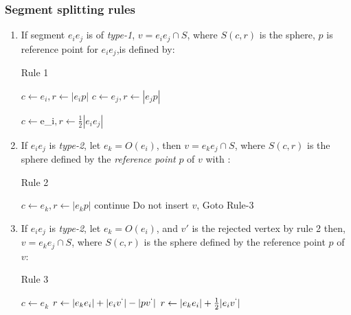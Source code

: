 \documentclass{beamer}
\begin{document}
\begin{frame}[allowframebreaks]
\frametitle{Segment splitting rules}
\begin{enumerate}
	\item	If segment $e_{i}e_{j}$ is of \textit{type-1}, $v = e_{i}e_{j}\cap S$, where $S(c, r)$ is the sphere, $p$ is reference point for $e_{i}e_{j}$,is defined by:
		\begin{algorithm}[H]
		\caption{Rule 1}
		\begin{algorithmic}[1]
				\State $c \gets e_i, r \gets |e_{i}p|$
				\State $c \gets e_j, r \gets |e_{j}p|$
			
			\Else
				\State $c \gets $e_i$, r \gets \frac{1}{2}|e_{i}e_{j}|$
			\EndIf	
		\EndProcedure
		\end{algorithmic}
		\end{algorithm}  
	\framebreak
	\item  If $e_{i}e_j$ is \textit{type-2}, let $e_k = O(e_i)$, then $v = e_{k}e_j \cap S$, where $S(c, r)$ is the sphere defined by the \textit{reference point} $p$ of $v$ with : 
	\begin{algorithm}[H]
	\caption{Rule 2}
	\begin{algorithmic}[1]
	        \State $c \gets e_{k}, r \gets |e_{k}p|$
	            \State continue
	        \Else
	            \State Do not insert $v$, Goto Rule-3
	        \EndIf     
	    \EndProcedure
	\end{algorithmic}
	\end{algorithm}
    \framebreak
	\item If $e_{i}e_j$ is \textit{type-2}, let $e_k = O(e_i)$, and $v'$ is the rejected vertex by rule 2 then, $v = e_{k}e_j \cap S$, where $S(c, r)$ is the sphere defined by the reference point $p$ of $v$:
	\begin{algorithm}[H]
	\caption{Rule 3}
	\begin{algorithmic}[1]
	        \State $c \gets e_k$
	            \State $r \gets |e_{k}e_{i}| + |e_{i}v^{`}| - |pv^{`}|$
	        \Else
	            \State $r \gets |e_{k}e_i| + \frac{1}{2}|e_{i}v^{`}|$
	        \EndIf
	    \EndProcedure
	\end{algorithmic}
	\end{algorithm}
\end{enumerate}
\end{frame}
\end{document}
